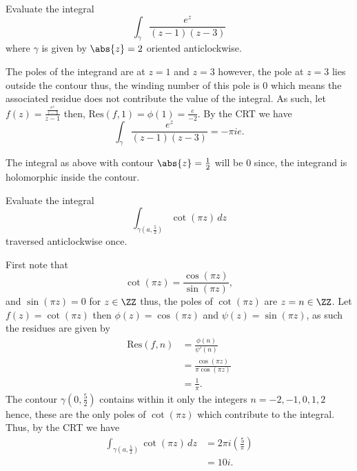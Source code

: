 \documentclass[12pt, a4paper]{article}
\begin{document}
\begin{example}
    Evaluate the integral
    \[\int_{\gamma} \frac{e^z}{(z-1)(z-3)}\]
    where \(\gamma\) is given by \(\abs{z}=2\) oriented anticlockwise.
    \begin{solution}
        The poles of the integrand are at \(z=1\) and \(z=3\) however, the pole at \(z=3\) lies outside the contour thus, the winding number of this pole is \(0\) which means the associated residue does not contribute the value of the integral. As such, let \(f(z) = \frac{\frac{e^z}{z-3}}{z-1}\) then, \(\text{Res}(f,1)=\phi(1)=\frac{e}{-2}\). By the CRT we have 
        \[\int_{\gamma} \frac{e^z}{(z-1)(z-3)} = -\pi i e.\]
    \end{solution}
\end{example}

\begin{example}
    The integral as above with contour \(\abs{z} =\frac{1}{2}\) will be \(0\) since, the integrand is holomorphic inside the contour.
\end{example}

\begin{example}
    Evaluate the integral 
    \[\int_{\gamma\left(a,\frac{5}{2}\right)} \cot(\pi z) \, dz\]
    traversed anticlockwise once.
    \begin{solution}
        First note that 
        \[\cot(\pi z) = \frac{\cos(\pi z)}{\sin(\pi z)},\]
        and \(\sin(\pi z) =0\) for \(z \in \ZZ\) thus, the poles of \(\cot(\pi z)\) are \(z =n \in \ZZ\). Let \(f(z) = \cot(\pi z)\) then \(\phi(z)=\cos(\pi z)\) and \(\psi(z) = \sin(\pi z)\), as such the residues are given by 
        \[\begin{aligned}
            \text{Res}(f,n) &= \frac{\phi(n)}{\psi'(n)} \\
            &= \frac{\cos(\pi z)}{\pi \cos(\pi z)} \\
            &= \frac{1}{\pi}.
        \end{aligned}\]
        The contour \(\gamma(0,\frac{5}{2})\) contains within it only the integers \(n=-2,-1,0,1,2\) hence, these are the only poles of \(\cot(\pi z)\) which contribute to the integral. Thus, by the CRT we have 
        \[\begin{aligned}
            \int_{\gamma\left(a,\frac{5}{2}\right)} \cot(\pi z) \, dz &= 2\pi i \left(\frac{5}{\pi} \right) \\
            &= 10i.
        \end{aligned}\]
    \end{solution}
\end{example}
\end{document}
